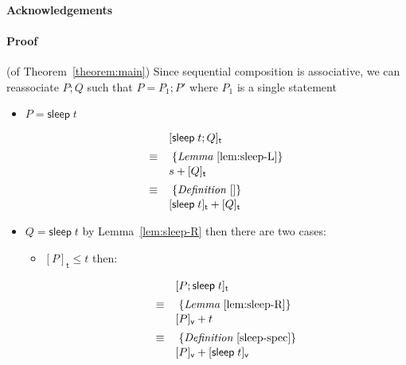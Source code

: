 \documentclass[preprint]{sigplanconf}
\renewcommand{\leq}{\leqslant}
\newcommand{\note}[1]{{\color{blue}{#1}}}
\theoremstyle{definition}
\newcommand{\sleep}{\mathsf{sleep}\;}
\newcommand{\vtime}[1]{[#1]_{\mathsf{v}}}
\newcommand{\etime}[1]{[#1]_{\mathsf{t}}}
\begin{document}
\note{TODO}

\paragraph{Acknowledgements}



\appendix



\paragraph{Proof} (of Theorem~\ref{theorem:main})
\note{These are just rough notes}
Since sequential composition is associative, we can reassociate
$P; Q$ such that $P = P_1; P'$ where $P_1$ is a single statement

\begin{itemize}
\item $P = \sleep t$

\begin{align*}
\begin{array}{ll}
       & \etime{\sleep t; Q} \\[0.5em]
\equiv & \; \{\textit{Lemma}~\ref{lem:sleep-L}\} \\[0.1em]
       & s + \etime{Q} \\[0.5em]
\equiv & \; \{\textit{Definition}~\ref{}\} \\[0.1em]
       & \etime{\sleep t} + \etime{Q}
\end{array}
\end{align*}

\item $Q = \sleep t$ by Lemma~\ref{lem:sleep-R} then
there are two cases:

\begin{itemize}
\item $\etime{P} \leq t$ then:

\begin{align*}
\begin{array}{ll}
       & \etime{P; \sleep t} \\[0.5em]
\equiv & \; \{\textit{Lemma}~\ref{lem:sleep-R}\} \\[0.1em]
       & \vtime{P} + t \\[0.5em]
\equiv & \; \{\textit{Definition}~\ref{sleep-spec}\} \\[0.1em]
       & \vtime{P} + \vtime{\sleep t}
\end{array}
\end{align*}


\end{itemize}
\end{itemize}
\end{document}
